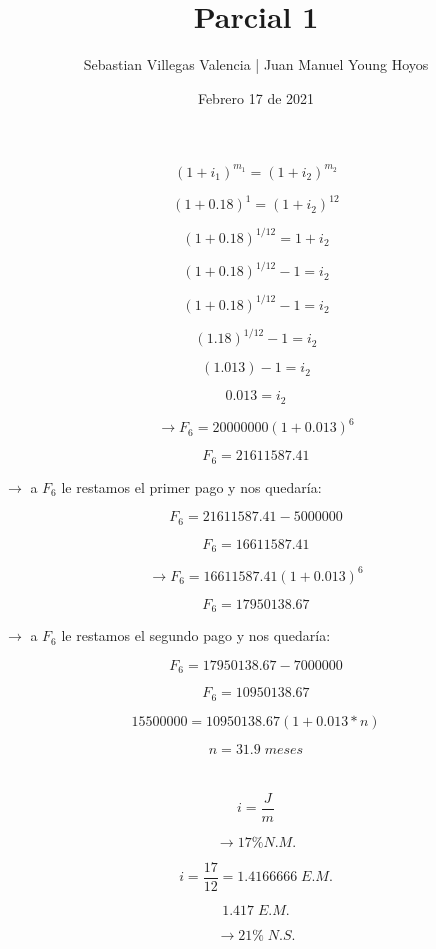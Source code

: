 \documentclass[12pt, letterpaper, twoside]{article}
\title{Parcial 1}
\date{Febrero 17 de 2021}
\author{ Sebastian Villegas Valencia | Juan Manuel Young Hoyos}
\begin{document}
    \maketitle

    \section{}


    \[ (1 + i_1)^{m_1} =  (1 + i_2)^{m_2} \]

    \[ (1 + 0.18)^{1} =  (1 + i_2)^{12} \]

    \[ (1 + 0.18)^{1/12} =  1 + i_2 \]

    \[ (1 + 0.18)^{1/12} - 1 = i_2 \]

    \[ (1 + 0.18)^{1/12} - 1 = i_2 \]

    \[ (1.18)^{1/12} - 1 = i_2 \]

    \[ (1.013) - 1 = i_2 \]

    \[ 0.013 = i_2 \]

    \[ \rightarrow F_6 = 20000000 (1 + 0.013)^6 \]

    \[ F_6 = 21611587.41 \]
    
    \( \rightarrow \) a \( F_6 \) le restamos el primer pago y nos quedaría:

    \[ F_6 = 21611587.41 - 5000000 \]

    \[ F_6 = 16611587.41\]

    \[ \rightarrow F_6 = 16611587.41 (1 + 0.013)^6 \]

    \[ F_6 = 17950138.67\]

    \( \rightarrow \) a \( F_6 \) le restamos el segundo pago y nos quedaría:

    \[ F_6 = 17950138.67 - 7000000 \]

    \[ F_6 = 10950138.67 \]

    \[ 15500000 = 10950138.67 (1 + 0.013 * n) \]

    \[ n = 31.9 \; meses \]

\section{}

\[ i = \frac{J}{m} \]

\[ \rightarrow 17\% N.M. \]

\[ i = \frac{17}{12} = 1.4166666 \; E.M. \]

\[ 1.417 \; E.M. \]

\[ \rightarrow 21\% \; N.S. \]
\end{document}
